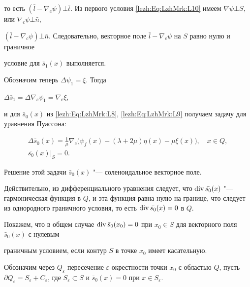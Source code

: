 то есть $(\bar{l}-\nabla_c \psi) \bot \bar{t}$. Из первого условия \eqref{lezh:Eq:LzhMrk:L10} имеем  $\nabla \psi \bot S$, или $\nabla_c \psi \bot \bar{n}$,

\mbox{$(\bar{l}-\nabla_c \psi) \bot \bar{n}$.} Следовательно, векторное поле $\bar{l}-\nabla_c \psi$ на $S$ равно нулю и граничное

условие для $\bar{s}_1(x)$ выполняется.



Обозначим теперь $\Delta \psi_1 = \xi$. Тогда

$

   \Delta \bar{s}_1 = \Delta \nabla_c \psi_1 = \nabla_c \xi,

$

и для $\bar{s}_0(x)$ из \eqref{lezh:Eq:LzhMrk:L8}, \eqref{lezh:Eq:LzhMrk:L9} получаем задачу для уравнения Пуассона:

\begin{gather}

   \label{lezh:Eq:LzhMrk:L11}

   \Delta \bar{s}_0(x) = \frac{1}{\mu} \nabla_c \bigl( \psi_f (x) - (\lambda+2\mu) \eta (x) - \mu \xi(x) \bigr) , \quad x \in Q,\\

   \label{lezh:Eq:LzhMrk:L12}

   \bar{s_{0}}(x)\big|_S = 0.

\end{gather}



Решение этой задачи $\bar{s}_0(x)$ "--- соленоидальное векторное поле. 

Действительно, из дифференциального уравнения следует, что $\text{div\,} \bar{s_0}(x)$ "--- гармоническая функция в $Q$, и эта функция равна нулю на границе, что следует из однородного граничного условия, то есть ${\rm div\,} \bar{s_{0}}(x) = 0$ в $Q$.



Покажем, что в общем случае $\text {div\,} \bar{s}_0(x_0) = 0$ при $x_0 \in S$ для векторного поля $ \bar{s}_0(x)$ с нулевым

граничным условием, если контур $S$ в точке $x_0$ имеет касательную.



Обозначим через $Q_\varepsilon$  пересечение $\varepsilon$-окрестности точки $x_0$ с областью $Q$, пусть $\partial Q_\varepsilon

= S_\varepsilon + C_\varepsilon$, где $S_\varepsilon \subset S$ и $\bar{s}_0(x) = 0$ при $x \in S_{\varepsilon}$.



